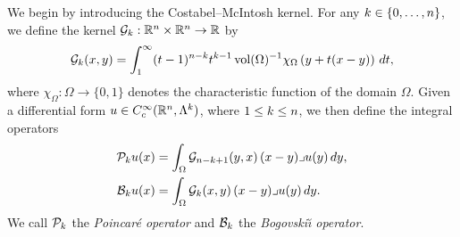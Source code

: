 \documentclass[10pt,a4paper]{article}
\begin{document}
We begin by introducing the Costabel--McIntosh kernel.
For any $k \in \{0,\dotsc,n\}$, we define the kernel ${\mathcal G}_{k} : {\mathbb R}^{n} \times {\mathbb R}^{n} \rightarrow {\mathbb R}$ by
\begin{equation}\label{math:mainkernel}
  {\mathcal G}_{k}(x,y) = \int_{1}^\infty (t-1)^{n-k}t^{k-1} \operatorname{vol}(\Omega)^{-1}\chi_{\Omega} \left(y+t(x-y)\right)\,dt
  ,
\end{equation}
where $\chi_{\Omega} : \Omega \rightarrow \{0,1\}$ denotes the characteristic function of the domain $\Omega$.
Given a differential form $u \in {C^\infty_c}({\mathbb R}^n,\Lambda^k)$, where \(1 \leq k \leq n\), 
we then define the integral operators
\begin{align*}
  {\mathcal P}_{k} u(x) &= \int_{\Omega} {\mathcal G}_{n-k+1}(y,x) \,(x-y)\lrcorner u(y)\,dy,
  \\
  {\mathcal B}_{k} u(x) &= \int_{\Omega} {\mathcal G}_{k}(x,y) \,(x-y)\lrcorner u(y)\,dy.
\end{align*}
We call ${\mathcal P}_{k}$ the \emph{Poincar\'e operator} and ${\mathcal B}_{k}$ the \emph{Bogovski\u{\i} operator}. 
\end{document}
